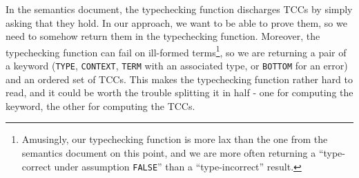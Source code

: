 \documentclass[utf8,a4paper]{article}
\begin{document}
In the semantics document, the typechecking function discharges TCCs
by simply asking that they hold. In our approach, we want to be able
to prove them, so we need to somehow return them in the typechecking
function. Moreover, the typechecking function can fail on ill-formed
terms\footnote{Amusingly, our typechecking function is more lax than
  the one from the semantics document on this point, and we are more
  often returning a ``type-correct under assumption \verb!FALSE!''
  than a ``type-incorrect'' result.}, so we are returning a pair of a
keyword (\verb!TYPE!, \verb!CONTEXT!, \verb!TERM! with an associated
type, or \verb!BOTTOM! for an error) and an ordered set of TCCs. This
makes the typechecking function rather hard to read, and it could be
worth the trouble splitting it in half - one for computing the
keyword, the other for computing the TCCs.
\end{document}
